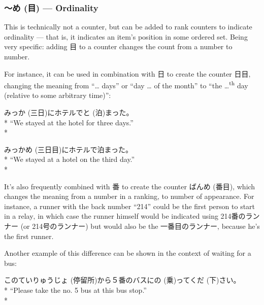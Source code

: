 \documentclass[11pt, b5paper, twoside, openright, onecolumn]{book}
\makeatletter
\newcommand*{\rubystack}[2]{{\relscale{0.5}%
  \begin{tabular}[b]{@{}c@{}}%
    {#1}\\%
   {\textscale{2}{#2}}%
  \end{tabular}}%
}
\DeclareRobustCommand*{\ruby}[2]{%
  \mbox{%
    \setlength{\parskip}{0ex}%
    \BeginAccSupp{method=pdfstringdef,ActualText={#1}}%
      \rubystack{\phantom{#2}}{#1}%
      \llap{%
        \rubystack{#2}{\phantom{#1}}%
      }%
    \EndAccSupp{}%
  }%
}
\renewcommand*{\ruby}[2]{#2 (#1)}%
\newenvironment{exampleblock}{
\setlength{\parindent}{0.6in}
\begin{minipage}[t]{\dimexpr\textwidth-\parindent}}
{\end{minipage}}
\makeatother
\begin{document}
\subsubsection{～\ruby{目}{め} — Ordinality}

This is technically not a counter‚ but can be added to rank counters to indicate ordinality — that is‚ it indicates an item’s position in some ordered set. Being very specific: adding 目 to a counter changes the count from a  number to  number.

For instance‚ it can be used in combination with 日 to create the counter 日目‚ changing the meaning from “… days” or “day … of the month” to “the …\textsuperscript{th} day (relative to some arbitrary time)”:

\vspace{0.4cm}
\begin{exampleblock}
\ruby{三日}{みっか}にホテルで\ruby{泊}{と}まった。 \\* 
“We stayed at the hotel for three days.” \\* 
\end{exampleblock}
\vspace{0.2cm}

\begin{exampleblock}
\ruby{三日目}{みっかめ}にホテルで泊まった。 \\* 
“We stayed at a hotel on the third day.” \\* 
\end{exampleblock}
\vspace{0.2cm}

It’s also frequently combined with 番 to create the counter \ruby{番目}{ばんめ}‚ which changes the meaning from a number in a ranking‚ to number of appearance. For instance‚ a runner with the back number “214” could be the first person to start in a relay‚ in which case the runner himself would be indicated using 214番のランナー (or 214号のランナー) but would also be the 一番目のランナー‚ because he’s the first runner. 

Another example of this difference can be shown in the context of waiting for a bus:

\vspace{0.4cm}
\begin{exampleblock}
この\ruby{停留所}{ていりゅうじょ}から５番のバスに\ruby{乗}{の}って\ruby{下}{くだ}さい。 \\* 
“Please take the no. 5 bus at this bus stop.” \\* 
\end{exampleblock}
\vspace{0.2cm}
\end{document}
